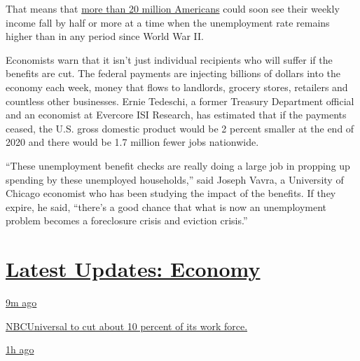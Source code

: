 That means that
\href{https://www.nytimes.com/2020/07/17/business/how-many-are-collecting-unemployment-benefits-its-hard-to-say.html}{more
than 20 million Americans} could soon see their weekly income fall by
half or more at a time when the unemployment rate remains higher than in
any period since World War II.

Economists warn that it isn't just individual recipients who will suffer
if the benefits are cut. The federal payments are injecting billions of
dollars into the economy each week, money that flows to landlords,
grocery stores, retailers and countless other businesses. Ernie
Tedeschi, a former Treasury Department official and an economist at
Evercore ISI Research, has estimated that if the payments ceased, the
U.S. gross domestic product would be 2 percent smaller at the end of
2020 and there would be 1.7 million fewer jobs nationwide.

``These unemployment benefit checks are really doing a large job in
propping up spending by these unemployed households,'' said Joseph
Vavra, a University of Chicago economist who has been studying the
impact of the benefits. If they expire, he said, ``there's a good chance
that what is now an unemployment problem becomes a foreclosure crisis
and eviction crisis.''

\hypertarget{latest-updates-economy}{%
\section{\texorpdfstring{\href{https://www.nytimes.com/live/2020/08/04/business/stock-market-today-coronavirus?action=click\&pgtype=Article\&state=default\&region=MAIN_CONTENT_1\&context=storylines_live_updates}{Latest
Updates:
Economy}}{Latest Updates: Economy}}\label{latest-updates-economy}}

\href{https://www.nytimes.com/live/2020/08/04/business/stock-market-today-coronavirus?action=click\&pgtype=Article\&state=default\&region=MAIN_CONTENT_1\&context=storylines_live_updates\#nbcuniversal-to-cut-about-10-percent-of-its-work-force}{9m
ago}

\href{https://www.nytimes.com/live/2020/08/04/business/stock-market-today-coronavirus?action=click\&pgtype=Article\&state=default\&region=MAIN_CONTENT_1\&context=storylines_live_updates\#nbcuniversal-to-cut-about-10-percent-of-its-work-force}{NBCUniversal
to cut about 10 percent of its work force.}

\href{https://www.nytimes.com/live/2020/08/04/business/stock-market-today-coronavirus?action=click\&pgtype=Article\&state=default\&region=MAIN_CONTENT_1\&context=storylines_live_updates\#loans-are-harder-to-get-even-as-interest-rates-are-low}{1h
ago}

